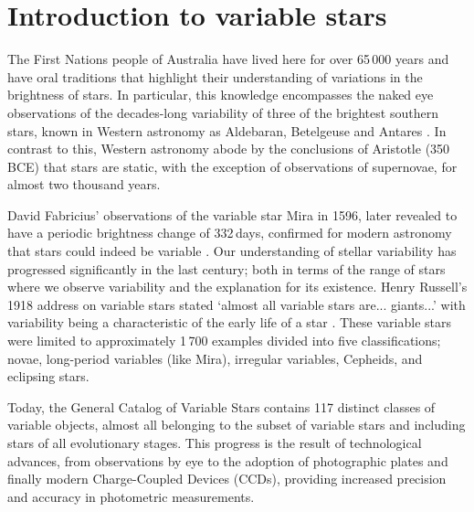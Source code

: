 \chapter{Introduction to variable stars}

The First Nations people of Australia have lived here for over 65\,000 years and have oral traditions that highlight their understanding of variations in the brightness of stars. In particular, this knowledge encompasses the naked eye observations of the decades-long variability of three of the brightest southern stars, known in Western astronomy as Aldebaran, Betelgeuse and Antares \citep{hamacher_observations_2018}. In contrast to this, Western astronomy abode by the conclusions of Aristotle (350 BCE) that stars are static, with the exception of observations of supernovae, for almost two thousand years. 

David Fabricius' observations of the variable star Mira in 1596, later revealed to have a periodic brightness change of 332\,days, confirmed for modern astronomy that stars could indeed be variable \citep{hoffleit_history_1997}. Our understanding of stellar variability has progressed significantly in the last century; both in terms of the range of stars where we observe variability and the explanation for its existence. Henry Russell's 1918 address on variable stars stated `almost all variable stars are... giants...' with variability being a characteristic of the early life of a star \citep{payne-gaposchkin_development_1978}. These variable stars were limited to approximately 1\,700 examples divided into five classifications; novae, long-period variables (like Mira), irregular variables, Cepheids, and eclipsing stars. 

Today, the General Catalog of Variable Stars \citep{samus_general_2017} contains 117 distinct classes of variable objects, almost all belonging to the subset of variable stars and including stars of all evolutionary stages. This progress is the result of technological advances, from observations by eye to the adoption of photographic plates and finally modern Charge-Coupled Devices (CCDs), providing increased precision and accuracy in photometric measurements.





